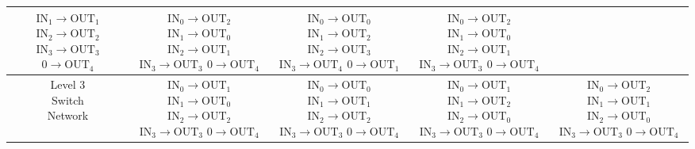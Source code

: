 \begin{table}
\begin{tabular}{|c|c|c|c|c|}
{$\textrm{IN}_1 \rightarrow \textrm{OUT}_1$\\
$\textrm{IN}_2 \rightarrow \textrm{OUT}_2$\\
$\textrm{IN}_3 \rightarrow \textrm{OUT}_3$\\
$0 \rightarrow \textrm{OUT}_4$} &
\shortstack{$\textrm{IN}_0 \rightarrow \textrm{OUT}_2$\\
$\textrm{IN}_1 \rightarrow \textrm{OUT}_0$\\
$\textrm{IN}_2 \rightarrow \textrm{OUT}_1$\\
$\textrm{IN}_3 \rightarrow \textrm{OUT}_3$\\
$0 \rightarrow \textrm{OUT}_4$} &
\shortstack{$\textrm{IN}_0 \rightarrow \textrm{OUT}_0$\\
$\textrm{IN}_1 \rightarrow \textrm{OUT}_2$\\
$\textrm{IN}_2 \rightarrow \textrm{OUT}_3$\\
$\textrm{IN}_3 \rightarrow \textrm{OUT}_4$\\
$0 \rightarrow \textrm{OUT}_1$} &
\shortstack{$\textrm{IN}_0 \rightarrow \textrm{OUT}_2$\\
$\textrm{IN}_1 \rightarrow \textrm{OUT}_0$\\
$\textrm{IN}_2 \rightarrow \textrm{OUT}_1$\\
$\textrm{IN}_3 \rightarrow \textrm{OUT}_3$\\
$0 \rightarrow \textrm{OUT}_4$}\\

        \hline
        \shortstack{Level 3\\Switch\\Network} &
            \shortstack{$\textrm{IN}_0 \rightarrow \textrm{OUT}_1$\\
$\textrm{IN}_1 \rightarrow \textrm{OUT}_0$\\
$\textrm{IN}_2 \rightarrow \textrm{OUT}_2$\\
$\textrm{IN}_3 \rightarrow \textrm{OUT}_3$\\
$0 \rightarrow \textrm{OUT}_4$} &
\shortstack{$\textrm{IN}_0 \rightarrow \textrm{OUT}_0$\\
$\textrm{IN}_1 \rightarrow \textrm{OUT}_1$\\
$\textrm{IN}_2 \rightarrow \textrm{OUT}_2$\\
$\textrm{IN}_3 \rightarrow \textrm{OUT}_3$\\
$0 \rightarrow \textrm{OUT}_4$} &
\shortstack{$\textrm{IN}_0 \rightarrow \textrm{OUT}_1$\\
$\textrm{IN}_1 \rightarrow \textrm{OUT}_2$\\
$\textrm{IN}_2 \rightarrow \textrm{OUT}_0$\\
$\textrm{IN}_3 \rightarrow \textrm{OUT}_3$\\
$0 \rightarrow \textrm{OUT}_4$} &
\shortstack{$\textrm{IN}_0 \rightarrow \textrm{OUT}_2$\\
$\textrm{IN}_1 \rightarrow \textrm{OUT}_1$\\
$\textrm{IN}_2 \rightarrow \textrm{OUT}_0$\\
$\textrm{IN}_3 \rightarrow \textrm{OUT}_3$\\
$0 \rightarrow \textrm{OUT}_4$}\\


\end{tabular}
\end{table}
